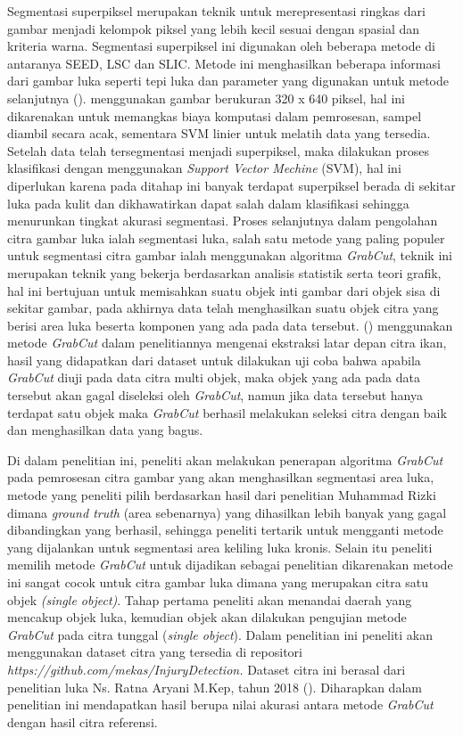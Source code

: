 Segmentasi superpiksel merupakan teknik untuk merepresentasi ringkas dari gambar 
menjadi kelompok piksel yang lebih kecil sesuai dengan spasial dan kriteria warna. 
Segmentasi superpiksel  ini digunakan oleh beberapa metode di antaranya SEED, LSC 
dan SLIC. Metode ini menghasilkan beberapa informasi dari gambar luka seperti tepi 
luka dan parameter yang digunakan untuk metode selanjutnya (\cite{Silva:2021}). 
\cite{Wang:2015} menggunakan gambar berukuran 320 x 640 piksel, hal ini dikarenakan 
untuk memangkas biaya komputasi dalam pemrosesan, sampel diambil secara acak, sementara 
SVM linier untuk melatih data yang tersedia. Setelah data telah tersegmentasi menjadi 
superpiksel, maka dilakukan proses klasifikasi dengan menggunakan \emph{Support Vector 
Mechine} (SVM), hal ini diperlukan karena pada ditahap ini banyak terdapat superpiksel 
berada di sekitar luka pada kulit dan dikhawatirkan dapat salah dalam klasifikasi 
sehingga menurunkan tingkat akurasi segmentasi. Proses selanjutnya dalam pengolahan 
citra gambar luka ialah segmentasi luka, salah satu metode yang paling populer untuk 
segmentasi citra gambar ialah menggunakan algoritma \emph{GrabCut}, teknik ini merupakan 
teknik yang bekerja berdasarkan analisis statistik serta teori grafik, hal ini 
bertujuan untuk memisahkan suatu objek inti gambar dari objek sisa di sekitar gambar, 
pada akhirnya data telah menghasilkan suatu objek citra yang berisi area luka beserta 
komponen yang ada pada data tersebut. (\cite{Nugraha:2022}) menggunakan metode 
\emph{GrabCut} dalam penelitiannya mengenai ekstraksi latar depan citra ikan, hasil yang 
didapatkan dari dataset untuk dilakukan uji coba bahwa apabila \emph{GrabCut} diuji pada 
data citra multi objek, maka objek yang ada pada data tersebut akan gagal diseleksi 
oleh \emph{GrabCut}, namun jika data tersebut hanya terdapat satu objek maka \emph{GrabCut} berhasil 
melakukan seleksi citra dengan baik dan menghasilkan data yang bagus.


Di dalam penelitian ini, peneliti akan melakukan penerapan algoritma \emph{GrabCut} pada 
pemrosesan citra gambar yang akan menghasilkan segmentasi area luka, metode yang 
peneliti pilih berdasarkan hasil dari penelitian Muhammad Rizki dimana \emph{ground truth} (area sebenarnya) 
yang dihasilkan lebih banyak yang gagal dibandingkan yang berhasil, sehingga peneliti 
tertarik untuk mengganti metode yang dijalankan untuk segmentasi area keliling luka 
kronis. Selain itu peneliti memilih metode \emph{GrabCut} untuk dijadikan sebagai 
penelitian dikarenakan metode ini sangat cocok untuk citra gambar luka dimana yang 
merupakan citra satu objek \emph{(single object)}. Tahap pertama peneliti akan menandai 
daerah yang mencakup objek luka, kemudian objek akan dilakukan pengujian metode 
\emph{GrabCut} pada citra tunggal (\emph{single object}). Dalam penelitian ini 
peneliti akan menggunakan dataset citra yang tersedia di repositori \emph{https://github.com/mekas/InjuryDetection.}
Dataset citra ini berasal dari penelitian luka Ns. Ratna Aryani M.Kep, tahun 2018 
(\cite{Aryani:2018}). Diharapkan dalam penelitian ini mendapatkan hasil berupa nilai 
akurasi antara metode \emph{GrabCut} dengan hasil citra referensi.

